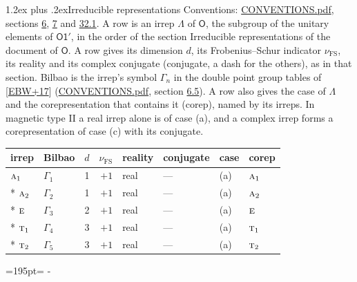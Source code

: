 \documentclass[10pt,a4paper]{article}
\makeatletter
\renewcommand\section{\@startsection{section}{1}{\z@}{-3ex plus -1ex minus -.2ex}%
  {1.2ex plus .2ex}{\normalfont\large\sffamily\bfseries\color{parttitle}}}
\newcommand{\needspace}[1]{\par\penalty-100\begingroup\dimen0=#1\relax\dimen2=\pagegoal
  \advance\dimen2-\pagetotal\ifdim\dimen0>\dimen2\relax\ifdim\dimen2>0pt\vfil\break\fi\fi
  \endgroup}
\numberwithin{equation}{section}
\newcommand{\grp}[1]{\mathsf{#1}}
\newcommand{\irr}[1]{\text{\normalfont\scshape #1}}
\newcommand{\fsind}{\nu_{\mathrm{FS}}}
\makeatother
\begin{document}
\section{Irreducible representations}\label{s:irreps}
Conventions: \href{../../CONVENTIONS.pdf}{CONVENTIONS.pdf}, sections \href{../../../rotation/CONVENTIONS.pdf\#conv.6}{6}, \href{../../../rotation/CONVENTIONS.pdf\#conv.7}{7} and \href{../../CONVENTIONS.pdf\#conv.32.1}{32.1}.
\leavevmode\label{n:irrep.Delta}A row is an irrep $\Lambda$ of $\grp{O}$, the subgroup of the unitary elements of $\grp{O1'}$, in the order of the section Irreducible representations of the document of \href{../../../rotation/data/pdf/O.pdf}{$\grp{O}$}. \label{n:index.dimension}\label{n:index.frobenius}\label{n:head.irrep}\label{n:head.reality}\label{n:head.conjugate}A row gives its dimension $d$, its Frobenius--Schur indicator $\fsind$, its reality and its complex conjugate (conjugate, a dash for the others), as in that section. \label{n:head.bilbao}\label{n:irrep.alias.gamma}Bilbao is the irrep's symbol $\Gamma_n$ in the double point group tables of [\href{../../../REFERENCES.pdf\#ref.EBW+17}{EBW+17}] (\href{../../CONVENTIONS.pdf}{CONVENTIONS.pdf}, section \href{../../../rotation/CONVENTIONS.pdf\#conv.6.5}{6.5}). \label{n:head.case.corep}\label{n:head.corep}A row also gives the case of $\Lambda$ and the corepresentation that contains it (corep), named by its irreps. In magnetic type II a real irrep alone is of case (a), and a complex irrep forms a corepresentation of case (c) with its conjugate.
\setlength{\emergencystretch}{2em}\par\setlength{\emergencystretch}{0pt}
{\small\renewcommand{\arraystretch}{1.25}\setlength{\tabcolsep}{4pt}\begin{longtable}{@{}llrrllll@{}}\toprule
irrep & Bilbao & $d$ & $\fsind$ & reality & conjugate & case & corep\\\midrule\endhead
\bottomrule\endfoot\endlastfoot
$\irr{a}_{1}$ & $\Gamma_{1}$ & 1 & $+1$ & real & --- & (a) & $\irr{a}_{1}$\\*
$\irr{a}_{2}$ & $\Gamma_{2}$ & 1 & $+1$ & real & --- & (a) & $\irr{a}_{2}$\\*
$\irr{e}$ & $\Gamma_{3}$ & 2 & $+1$ & real & --- & (a) & $\irr{e}$\\*
$\irr{t}_{1}$ & $\Gamma_{4}$ & 3 & $+1$ & real & --- & (a) & $\irr{t}_{1}$\\*
$\irr{t}_{2}$ & $\Gamma_{5}$ & 3 & $+1$ & real & --- & (a) & $\irr{t}_{2}$\\
\bottomrule\end{longtable}}
\needspace{195pt}
\end{document}
